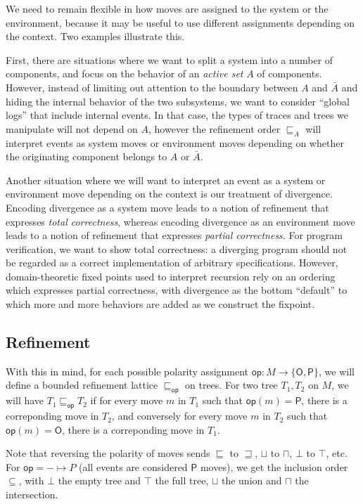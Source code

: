 \documentclass{article}
\newcommand{\kw}[1]{{\mathsf{#1}}}
\begin{document}
We need to remain flexible in how
moves are assigned to the system or the environment,
because it may be useful to use different assignments
depending on the context.
Two examples illustrate this.

First, there are situations where
we want to split a system into a number of components,
and focus on the behavior of an \emph{active set} $A$ of components.
However, instead of limiting out attention to
the boundary between $A$ and $\bar{A}$
and hiding the internal behavior of the two subsystems,
we want to consider ``global logs'' that include internal events.
In that case,
the types of traces and trees we manipulate will not depend on $A$,
however the refinement order $\sqsubseteq_A$
will interpret events as system moves or environment moves
depending on whether the originating component belongs to $A$ or $\bar{A}$.

Another situation where
we will want to interpret an event as a system or environment move
depending on the context
is our treatment of divergence.
Encoding divergence as a system move
leads to a notion of refinement that expresses \emph{total correctness},
whereas
encoding divergence as an environment move
leads to a notion of refinement that expresses \emph{partial correctness}.
For program verification,
we want to show total correctness:
a diverging program should not be regarded as
a correct implementation of arbitrary specifications.
However,
domain-theoretic fixed points used to interpret recursion
rely on an ordering which expresses partial correctness,
with divergence as the bottom ``default''
to which more and more behaviors are added
as we construct the fixpoint.

\subsection{Refinement}

With this in mind,
for each possible polarity assignment
$\kw{op} : M \rightarrow \{\kw{O}, \kw{P}\}$,
we will define a bounded refinement lattice $\sqsubseteq_\kw{op}$ on trees.
For two tree $T_1, T_2$ on $M$,
we will have $T_1 \sqsubseteq_\kw{op} T_2$ if
for every move $m$ in $T_1$ such that $\kw{op}(m) = \kw{P}$,
there is a correponding move in $T_2$, and conversely
for every move $m$ in $T_2$ such that $\kw{op}(m) = \kw{O}$,
there is a correponding move in $T_1$.

Note that reversing the polarity of moves
sends $\sqsubseteq$ to $\sqsupseteq$,
$\sqcup$ to $\sqcap$, $\bot$ to $\top$, etc.
For $\kw{op} = - \mapsto P$ (all events are considered $\kw{P}$ moves),
we get the inclusion order $\subseteq$,
with $\bot$ the empty tree and $\top$ the full tree,
$\sqcup$ the union and $\sqcap$ the intersection.
\end{document}
